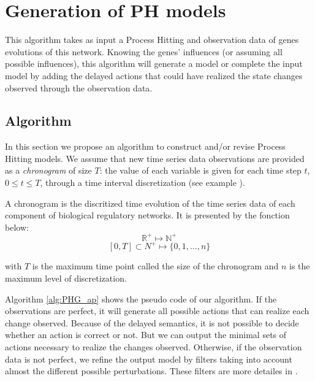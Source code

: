 
\section{Generation of PH models}
\label{sec:ph-generation}

This algorithm takes as input a Process Hitting and observation data of genes evolutions of this network.
Knowing the genes' influences (or assuming all possible influences),
this algorithm will generate a model or complete the input model by adding the delayed actions that could have realized the state changes observed through the observation data.

\subsection{Algorithm}
In this section we propose an algorithm to construct and/or revise Process Hitting models.
We assume that new time series data observations are provided as a {\it chronogram} of size $T$:
the value of each variable is given for each time step $t$, $0 \leq t \leq T$, through a time interval discretization (see example ).   

\begin{definition}[Chronogram]
A chronogram is the discritized time evolution of the time series data of each component of biological regulatory networks. It is presented by the fonction below: \\

$$\mathds{R}^+ \longmapsto \mathds{N}^+$$
$$ [0,T] \subset {N}^+ \longmapsto \{0,1,..., n\}$$

with $T$ is the maximum time point called the size of the chronogram and $n$ is the maximum level of discretization.
\end{definition}

Algorithm \ref{alg:PHG_ap} shows the pseudo code of our algorithm.
If the observations are perfect, it will generate all possible actions that can realize each change observed.
Because of the delayed semantics, it is not possible to decide whether an action is correct or not.
But we can output the minimal sets of actions necessary to realize the changes observed.
Otherwise, if the observation data is not perfect, we refine the output model by filters taking into account almost the different possible perturbations. These filters are more detailes in .




